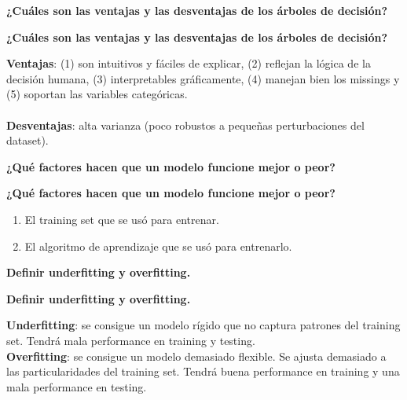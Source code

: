 \documentclass[10pt]{memoir}
\begin{document}
\clearpage
\begin{center}
	\textbf{\Large ¿Cuáles son las ventajas y las desventajas de los árboles de decisión?} \\
\end{center}

\clearpage
\begin{center}
	\textbf{\Large ¿Cuáles son las ventajas y las desventajas de los árboles de decisión?} \\
\end{center}
\noindent \textbf{Ventajas}: (1) son intuitivos y fáciles de explicar, (2) reflejan la lógica de la decisión humana, (3) interpretables gráficamente, (4) manejan bien los missings y (5) soportan las variables categóricas.\\
\\
\noindent \textbf{Desventajas}: alta varianza (poco robustos a pequeñas perturbaciones del dataset).

\clearpage
\begin{center}
	\textbf{\Large ¿Qué factores hacen que un modelo funcione mejor o peor?} \\
\end{center}

\clearpage
\begin{center}
	\textbf{\Large ¿Qué factores hacen que un modelo funcione mejor o peor?} \\
\end{center}
\begin{enumerate}
	\item El training set que se usó para entrenar.
	\item El algoritmo de aprendizaje que se usó para entrenarlo.
\end{enumerate}

\clearpage
\begin{center}
	\textbf{\Large Definir underfitting y overfitting.} \\
\end{center}

\clearpage
\begin{center}
	\textbf{\Large Definir underfitting y overfitting.} \\
\end{center}
\noindent \textbf{Underfitting}: se consigue un modelo rígido que no captura patrones del training set. Tendrá mala performance en training y testing. \\
\textbf{Overfitting}: se consigue un modelo demasiado flexible. Se ajusta demasiado a las particularidades del training set. Tendrá buena performance en training y una mala performance en testing.
\end{document}
